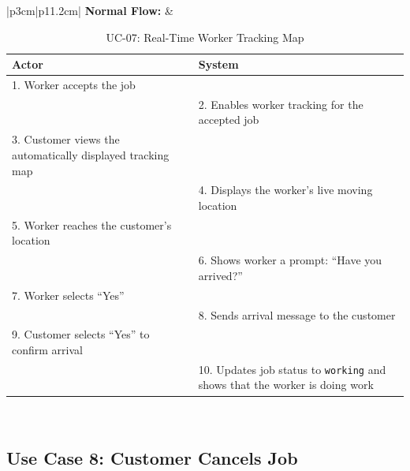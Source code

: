 \newpage

{\small
\renewcommand{\arraystretch}{1.05}
\begin{table}[H]
\centering
\begin{tabular}{|p{3cm}|p{11.2cm}|}
\hline
\textbf{Normal Flow:} &
\begin{tabular}[t]{|p{5.4cm}|p{5.4cm}|}
\hline
\textbf{Actor} & \textbf{System} \\ \hline
1. Worker accepts the job & \\ \hline
 & 2. Enables worker tracking for the accepted job \\ \hline
3. Customer views the automatically displayed tracking map & \\ \hline
 & 4. Displays the worker's live moving location \\ \hline
5. Worker reaches the customer's location & \\ \hline
 & 6. Shows worker a prompt: ``Have you arrived?'' \\ \hline
7. Worker selects ``Yes'' & \\ \hline
 & 8. Sends arrival message to the customer \\ \hline
9. Customer selects ``Yes'' to confirm arrival & \\ \hline
 & 10. Updates job status to \texttt{working} and shows that the worker is doing work \\ \hline
\end{tabular} \\ \hline
\end{tabular}
\caption{UC-07: Real-Time Worker Tracking Map}
\end{table}
}

\newpage

\subsection*{Use Case 8: Customer Cancels Job}

